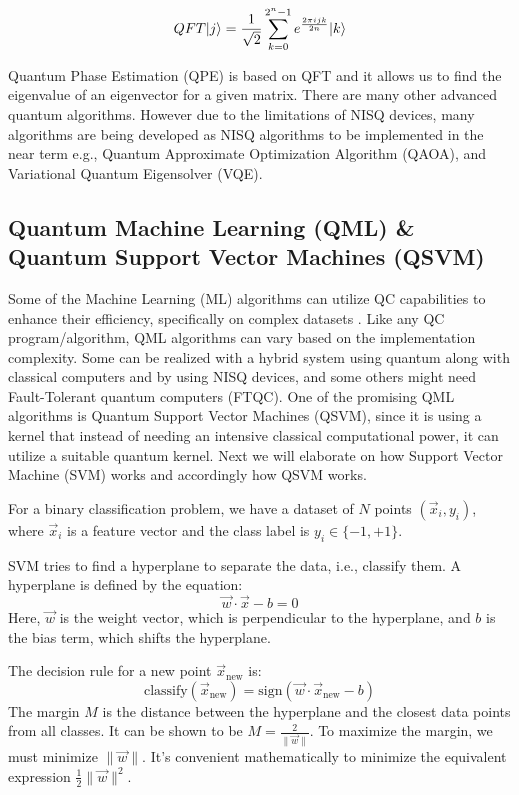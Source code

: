 \documentclass[12pt,a4paper]{article}
\DeclarePairedDelimiter\ket{\lvert}{\rangle}
\begin{document}
	\begin{equation}
		\label{eqn:equation2}
		QFT\ket{j} =  \frac{1}{\sqrt{2}} \sum_{k=0}^{2^n-1} e^\frac{2\pi ijk}{2n} \ket{k}
	\end{equation}
	
	Quantum Phase Estimation (QPE) is based on QFT and it allows us to find the eigenvalue of an eigenvector for a given matrix. There are many other advanced quantum algorithms. However due to the limitations of NISQ devices, many algorithms are being developed as NISQ algorithms to be implemented in the near term e.g., Quantum Approximate Optimization Algorithm (QAOA), and Variational Quantum Eigensolver (VQE). 
	
	\subsection{Quantum Machine Learning (QML) \& Quantum Support Vector Machines (QSVM) }
	
	Some of the Machine Learning (ML) algorithms can utilize QC capabilities to enhance their efficiency, specifically on complex datasets \cite{electronics12112379} \cite{maouaki2024quantumsupportvectormachine}. Like any QC program/algorithm, QML algorithms can vary based on the implementation complexity. Some can be realized with a hybrid system using quantum along with classical computers and by using NISQ devices, and some others might need Fault-Tolerant quantum computers (FTQC). One of the promising QML algorithms is Quantum Support Vector Machines (QSVM), since it is using a kernel that instead of needing an intensive classical computational power, it can utilize a suitable quantum kernel. Next we will elaborate on how Support Vector Machine (SVM) works and accordingly how QSVM works.
	
	For a binary classification problem, we have a dataset of $N$ points $(\vec{x}_i, y_i)$, where $\vec{x}_i$ is a feature vector and the class label is $y_i \in \{-1, +1\}$.
	
	SVM tries to find a hyperplane to separate the data, i.e., classify them. A hyperplane is defined by the equation:
	\[
	\vec{w} \cdot \vec{x} - b = 0
	\]
	Here, $\vec{w}$ is the weight vector, which is perpendicular to the hyperplane, and $b$ is the bias term, which shifts the hyperplane.
	
	The decision rule for a new point $\vec{x}_{\text{new}}$ is:
	\[
	\text{classify}(\vec{x}_{\text{new}}) = \text{sign}(\vec{w} \cdot \vec{x}_{\text{new}} - b)
	\]
	The margin $M$ is the distance between the hyperplane and the closest data points from all classes. It can be shown to be $M = \frac{2}{\|\vec{w}\|}$. To maximize the margin, we must minimize $\|\vec{w}\|$. It's convenient mathematically to minimize the equivalent expression $\frac{1}{2}\|\vec{w}\|^2$.
	
\end{document}
